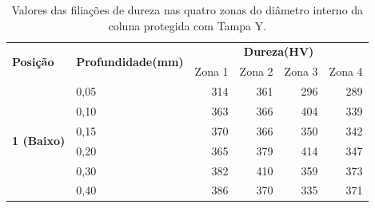 \begin{table}
    \centering
    \caption[Valores das filiações de dureza nas 4 zonas do diâmetro interno da coluna Y.]%
    {Valores das filiações de dureza nas quatro zonas do diâmetro interno da coluna protegida com Tampa Y.}
    \label{tab:resultados_dureza_DB45_Col_Y}
    \begin{tabular}{clrrrr} 
    \toprule
    \multicolumn{1}{l}{\multirow{2}{*}{\textbf{Posição}}} & \multicolumn{1}{c}{\multirow{2}{*}{\textbf{ Profundidade(mm)}}} & \multicolumn{4}{c}{\textbf{Dureza(HV)}}                                                                            \\ 
    \cline{3-6}
    \multicolumn{1}{l}{}                                  & \multicolumn{1}{c}{}                                            & \multicolumn{1}{c}{Zona 1} & \multicolumn{1}{c}{Zona 2} & \multicolumn{1}{c}{Zona 3} & \multicolumn{1}{c}{Zona 4}  \\ 
    \hline\hline
    \multirow{8}{*}{\textbf{1 (Baixo)}}                   & 0,05                                                            & 314                        & 361                        & 296                        & 289                         \\
                                                          & 0,10                                                            & 363                        & 366                        & 404                        & 339                         \\
                                                          & 0,15                                                            & 370                        & 366                        & 350                        & 342                         \\
                                                          & 0,20                                                            & 365                        & 379                        & 414                        & 347                         \\
                                                          & 0,30                                                            & 382                        & 410                        & 359                        & 373                         \\
                                                          & 0,40                                                            & 386                        & 370                        & 335                        & 371                         \\

\end{tabular}
\end{table}
